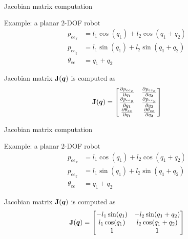 \begin{frame}{Jacobian matrix computation}
	\begin{minipage}{.4\columnwidth}
		Example:  a planar 2-DOF robot
		\begin{align*}
			p_{{ee}_x} &= l_1\cos(q_1)+l_2\cos(q_1+q_2)\\
			p_{{ee}_y} &= l_1\sin(q_1)+l_2\sin(q_1+q_2)\\
			\theta_{ee} &= q_1+q_2
		\end{align*}
	\end{minipage}
	\hfill
	\begin{minipage}{.5\columnwidth}
		Jacobian matrix $\mathbf{J}(\bm{q})$ is computed as 
		\begin{equation*}
			\mathbf{J}(\bm{q}) = \begin{bmatrix}
				\frac{\partial p_{{ee}_x}}{\partial q_1} & \frac{\partial p_{{ee}_x}}{\partial q_2} \\
				 \frac{\partial p_{{ee}_y}}{\partial q_1} & \frac{\partial p_{{ee}_y}}{\partial q_2} \\
				 \frac{\partial \theta_{{ee}}}{\partial q_1} & \frac{\partial \theta_{{ee}}}{\partial q_2}
			\end{bmatrix}
		\end{equation*}
	\end{minipage}
\end{frame}
\begin{frame}{Jacobian matrix computation}
	\begin{minipage}{.4\columnwidth}
		Example:  a planar 2-DOF robot
		\begin{align*}
			p_{{ee}_x} &= l_1\cos(q_1)+l_2\cos(q_1+q_2)\\
			p_{{ee}_y} &= l_1\sin(q_1)+l_2\sin(q_1+q_2)\\
			\theta_{ee} &= q_1+q_2
		\end{align*}
	\end{minipage}
	\hfill
	\begin{minipage}{.5\columnwidth}
		Jacobian matrix $\mathbf{J}(\bm{q})$ is computed as 
		\begin{equation*}
			\matriceJ(\vectorQ) = \begin{bmatrix}
				-l_1\sin(q_1) & -l_2\sin(q_1+q_2) \\
				l_1\cos(q_1) & l_2\cos(q_1+q_2) \\
				1 & 1
			\end{bmatrix}%
		\end{equation*}
	\end{minipage}
\end{frame}
